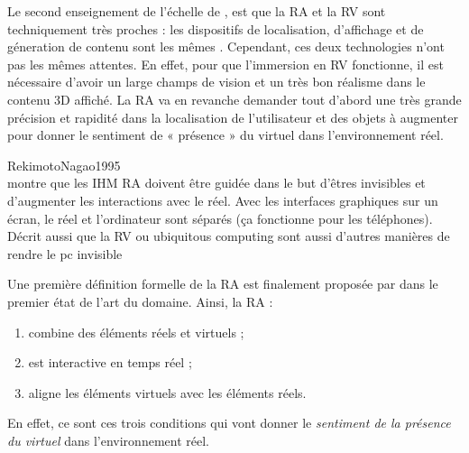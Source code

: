 Le second enseignement de l'échelle de \citeauthor{Milgram1994}, est que la RA et la RV sont techniquement très proches : les dispositifs de localisation, d'affichage et de géneration de contenu sont les mêmes \citep{Billinghurst2015}. Cependant, ces deux technologies n'ont pas les mêmes attentes. En effet, pour que l'immersion en RV fonctionne, il est nécessaire d'avoir un large champs de vision et un très bon réalisme dans le contenu 3D affiché. La RA va en revanche demander tout d'abord une très grande précision et rapidité dans la localisation de l'utilisateur et des objets à augmenter pour donner le sentiment de « présence » du virtuel dans l'environnement réel.


RekimotoNagao1995\\
montre que les IHM RA doivent être guidée dans le but d'êtres invisibles et d'augmenter les interactions avec le réel. Avec les interfaces graphiques sur un écran, le réel et l'ordinateur sont séparés (ça fonctionne pour les téléphones). Décrit aussi que la RV ou ubiquitous computing sont aussi d'autres manières de rendre le pc invisible

Une première définition formelle de la RA est finalement proposée par \cite{Azuma1997} dans le premier état de l'art du domaine. Ainsi, la RA :
\begin{enumerate}
  \item combine des éléments réels et virtuels ;
  \item est interactive en temps réel ;
  \item aligne les éléments virtuels avec les éléments réels.
\end{enumerate}
En effet, ce sont ces trois conditions qui vont donner le \emph{sentiment de la présence du virtuel} dans l'environnement réel. 

